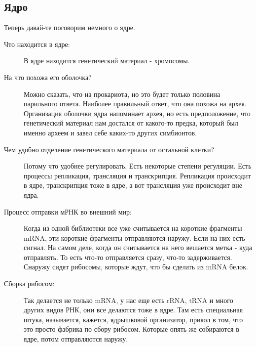 \subsection{Ядро}
Теперь давай-те поговорим немного о ядре. 
\begin{description}
\item[Что находится в ядре:]
В ядре находится генетический материал - хромосомы. 
\item[На что похожа его оболочка?]
Можно сказать, что на прокариота, но это будет только 
половина парильного ответа. Наиболее правильный ответ, 
что она похожа на архея. Организация оболочки ядра напоминает 
архея, но есть предположение, 
что генетический материал нам достался от какого-то предка, 
который был именно археем и завел себе каких-то других симбионтов. 

\item[Чем удобно отделение генетического материала от остальной клетки?] 
Потому что удобнее регулировать. Есть некоторые степени регуляции. 
Есть процессы репликация, трансляция и транскрипция. Репликация происходит в ядре, 
транскрипция тоже в ядре, а вот трансляция уже происходит вне ядра. 

\item[Процесс отправки мРНК во внешний мир:]
Когда из одной библиотеки все уже считывается на короткие фрагменты mRNA, эти 
короткие фрагменты отправляются наружу. Если на них есть сигнал. На самом 
деле, когда он считывается на него вешается метка - куда отправлять. То есть 
что-то отправляется сразу, что-то задерживается. Снаружу сидят рибосомы, 
которые ждут, что бы сделать из mRNA белок. 

\item[Сборка рибосом:]
Так делается не только mRNA, у нас еще есть rRNA, tRNA и 
много других видов РНК, они все делаются тоже в ядре. Там есть 
специальная штука, называется, кажется, ядрышковой организатор, 
прикол в том, что это просто фабрика по сбору рибосом. Которые 
опять же собираются в ядре, потом отправляются наружу. 


\end{description}
